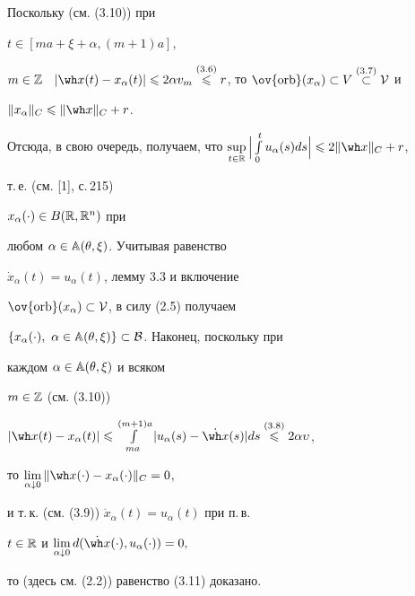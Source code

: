 \begin{pf}


Поскольку (см. (3.10)) при


$t\in[ma+\xi+\alpha,(m+1)a]$,


$m\in{\Bbb Z}$ \ $|\wh x(t)-x_{\alpha}(t)|\leqslant2\alpha


v_m\up{(3.6)}{\leqslant}{}r$, то $\ov{\orb}(x_\alpha)\subset


V\up{(3.7)}{\subset}{}\cal V$ и


$\|x_{\alpha}\|_C\leqslant\|\wh x\|_C+r$. 


Отсюда, в свою очередь, получаем, что $\sup\limits_{t\in\Bbb


R}\Big|\int\limits_{0}^{t}u_{\alpha}(s)ds\Big|\leqslant 2\|\wh x\|_C+r$,


т.\,е. (см. [1], с.\,215)


$x_{\alpha}(\cdot)\in B(\Bbb R,\Bbb R^n)$ при


любом $\alpha\in\Bbb A(\theta,\xi)$. Учитывая равенство


$\Dot x_{\alpha}(t)=u_{\alpha}(t)$, лемму 3.3 и включение


$\ov{\orb}(x_{\alpha})\subset\cal V$, в силу (2.5) получаем


$\{x_{\alpha}(\cdot),\ \alpha\in{\Bbb


A}(\theta,\xi)\}\subset\cal B$. Наконец, поскольку при


каждом $\alpha\in\Bbb A(\theta,\xi)$ и всяком


$m\in{\Bbb Z}$ (см. (3.10))


$|\wh x(t)-x_\alpha(t)|\leqslant\int\limits_{ma}^{(m+1)a}|u_\alpha(s)-


\Dot{\wh x}(s)|ds\up{(3.8)}{\leqslant}{}2\alpha\upsilon$,


то $\lim\limits_{\alpha\downarrow 0}\|\wh x(\cdot)-


x_\alpha(\cdot)\|_C=0$,


и т.\,к. (см. (3.9)) $\Dot x_\alpha(t)=u_\alpha(t)$ при п.\,в.


$t\in\Bbb R$ и ${\lim\limits_{\alpha\downarrow


0}d(\Dot{\wh x}(\cdot),u_{\alpha}(\cdot))=0,}$


то (здесь см. (2.2)) равенство (3.11) доказано.


\end{pf}








